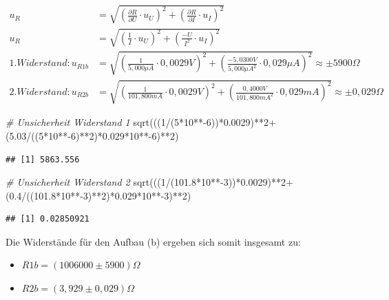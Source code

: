 \documentclass[
  9pt,
]{article}
\newenvironment{Shaded}{\begin{snugshade}}{\end{snugshade}}
\newcommand{\CommentTok}[1]{\textcolor[rgb]{0.56,0.35,0.01}{\textit{#1}}}
\newcommand{\DecValTok}[1]{\textcolor[rgb]{0.00,0.00,0.81}{#1}}
\newcommand{\FloatTok}[1]{\textcolor[rgb]{0.00,0.00,0.81}{#1}}
\newcommand{\FunctionTok}[1]{\textcolor[rgb]{0.00,0.00,0.00}{#1}}
\newcommand{\NormalTok}[1]{#1}
\newcommand{\SpecialCharTok}[1]{\textcolor[rgb]{0.00,0.00,0.00}{#1}}
\begin{document}
\begin {equation*}
\begin{split}
u_R &= \sqrt{\left (\frac{\partial R}{\partial U} \cdot u_U\right )^2 + \left (\frac{\partial R}{\partial I} \cdot u_I\right )^2 } \\
u_R &= \sqrt{\left (\frac{1}{I} \cdot u_U\right )^2 + \left (\frac{-U}{I^2} \cdot u_I\right )^2 } \\
1.Widerstand: u_{R1b}&= \sqrt{\left (\frac{1}{5,000\mu A} \cdot 0,0029V\right )^2 + \left (\frac{-5,0300V}{5,000\mu A^2} \cdot 0,029 \mu A\right )^2 } \approx \pm 5900\Omega \\
2.Widerstand: u_{R2b}&= \sqrt{\left (\frac{1}{101,800mA} \cdot 0,0029V \right )^2 + \left (\frac{0,4000V}{101,800mA^2} \cdot 0,029mA\right )^2 } \approx \pm 0,029\Omega
\end{split}
\end{equation*}

\begin{Shaded}
\begin{Highlighting}[]
\CommentTok{\# Unsicherheit Widerstand 1}
\FunctionTok{sqrt}\NormalTok{(((}\DecValTok{1}\SpecialCharTok{/}\NormalTok{(}\DecValTok{5}\SpecialCharTok{*}\DecValTok{10}\SpecialCharTok{**{-}}\DecValTok{6}\NormalTok{))}\SpecialCharTok{*}\FloatTok{0.0029}\NormalTok{)}\SpecialCharTok{**}\DecValTok{2}\SpecialCharTok{+}\NormalTok{(}\FloatTok{5.03}\SpecialCharTok{/}\NormalTok{((}\DecValTok{5}\SpecialCharTok{*}\DecValTok{10}\SpecialCharTok{**{-}}\DecValTok{6}\NormalTok{)}\SpecialCharTok{**}\DecValTok{2}\NormalTok{)}\SpecialCharTok{*}\FloatTok{0.029}\SpecialCharTok{*}\DecValTok{10}\SpecialCharTok{**{-}}\DecValTok{6}\NormalTok{)}\SpecialCharTok{**}\DecValTok{2}\NormalTok{)}
\end{Highlighting}
\end{Shaded}

\begin{verbatim}
## [1] 5863.556
\end{verbatim}

\begin{Shaded}
\begin{Highlighting}[]
\CommentTok{\# Unsicherheit Widerstand 2}
\FunctionTok{sqrt}\NormalTok{(((}\DecValTok{1}\SpecialCharTok{/}\NormalTok{(}\FloatTok{101.8}\SpecialCharTok{*}\DecValTok{10}\SpecialCharTok{**{-}}\DecValTok{3}\NormalTok{))}\SpecialCharTok{*}\FloatTok{0.0029}\NormalTok{)}\SpecialCharTok{**}\DecValTok{2}\SpecialCharTok{+}\NormalTok{(}\FloatTok{0.4}\SpecialCharTok{/}\NormalTok{((}\FloatTok{101.8}\SpecialCharTok{*}\DecValTok{10}\SpecialCharTok{**{-}}\DecValTok{3}\NormalTok{)}\SpecialCharTok{**}\DecValTok{2}\NormalTok{)}\SpecialCharTok{*}\FloatTok{0.029}\SpecialCharTok{*}\DecValTok{10}\SpecialCharTok{**{-}}\DecValTok{3}\NormalTok{)}\SpecialCharTok{**}\DecValTok{2}\NormalTok{)}
\end{Highlighting}
\end{Shaded}

\begin{verbatim}
## [1] 0.02850921
\end{verbatim}

Die Widerstände für den Aufbau (b) ergeben sich somit insgesamt zu:

\begin{itemize}
\item $R1b = (1006000\pm 5900)\Omega $
\item $R2b = (3,929\pm 0,029) \Omega$
\end{itemize}
\end{document}
